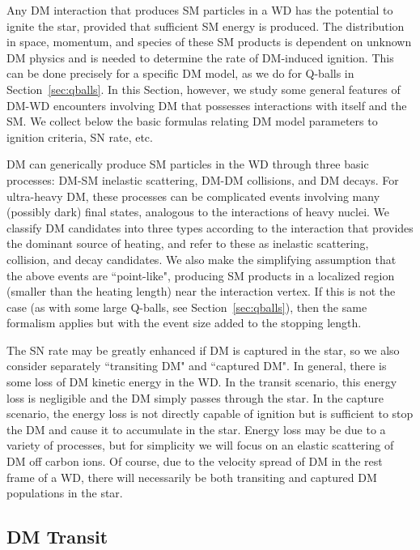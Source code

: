 Any DM interaction that produces SM particles in a WD has the potential to ignite the star, provided that sufficient SM energy is produced.
The distribution in space, momentum, and species of these SM products is dependent on unknown DM physics and is needed to determine the rate of DM-induced ignition.
This can be done precisely for a specific DM model, as we do for Q-balls in Section~\ref{sec:qballs}.
In this Section, however, we study some general features of DM-WD encounters involving DM that possesses interactions with itself and the SM.
We collect below the basic formulas relating DM model parameters to ignition criteria, SN rate, etc.

DM can generically produce SM particles in the WD through three basic processes: DM-SM inelastic scattering, DM-DM collisions, and DM decays.
For ultra-heavy DM, these processes can be complicated events involving many (possibly dark) final states, analogous to the interactions of heavy nuclei.
We classify DM candidates into three types according to the interaction that provides the dominant source of heating, and refer to these as inelastic scattering, collision, and decay candidates.
We also make the simplifying assumption that the above events are ``point-like", producing SM products in a localized region (smaller than the heating length) near the interaction vertex.
If this is not the case (as with some large Q-balls, see Section~\ref{sec:qballs}), then the same formalism applies but with the event size added to the stopping length.

The SN rate may be greatly enhanced if DM is captured in the star, so we also consider separately ``transiting DM" and ``captured DM".
In general, there is some loss of DM kinetic energy in the WD.
In the transit scenario, this energy loss is negligible and the DM simply passes through the star.
In the capture scenario, the energy loss is not directly capable of ignition but is sufficient to stop the DM and cause it to accumulate in the star.
Energy loss may be due to a variety of processes, but for simplicity we will focus on an elastic scattering of DM off carbon ions.
Of course, due to the velocity spread of DM in the rest frame of a WD, there will necessarily be both transiting and captured DM populations in the star.

\subsection{DM Transit}

